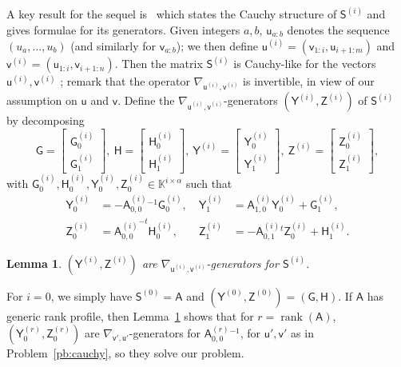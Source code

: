 \documentclass{sig-alternate}
\newcommand{\vu}{\ensuremath{\mathsf{u}}}
\newcommand{\vv}{\ensuremath{\mathsf{v}}}
\newcommand{\mA}{\ensuremath{\mathsf{A}}}
\newcommand{\mG}{\ensuremath{\mathsf{G}}}
\newcommand{\mH}{\ensuremath{\mathsf{H}}}
\newcommand{\mS}{\ensuremath{\mathsf{S}}}
\newcommand{\mY}{\ensuremath{\mathsf{Y}}}
\newcommand{\mZ}{\ensuremath{\mathsf{Z}}}
\newcommand{\K}{\ensuremath{\mathbb{K}}}
\newcommand{\rank}{\ensuremath{\operatorname{rank}}}
\newtheorem{lemma}[definition]{Lemma}
\begin{document}
A key result for the sequel is~\cite[Proposition~1]{Cardinal99} which states the
Cauchy structure of $\mS^{(i)}$ and gives formulae for its generators. Given
integers $a,b$, $\vu_{a:b}$ denotes the sequence $(u_a,\dots,u_b)$ (and
similarly for $\vv_{a:b}$); we then define $\vu^{(i)}=(\vv_{1:i},\vu_{i+1:m})$
and $\vv^{(i)}=(\vu_{1:i},\vv_{i+1:n})$. Then the matrix $\mS^{(i)}$ is
Cauchy-like for the vectors $\vu^{(i)}, \vv^{(i)}$ ; remark that the operator
$\nabla_{\vu^{(i)},\vv^{(i)}}$ is invertible, in view of our assumption on $\vu$
and $\vv$. Define the $\nabla_{\vu^{(i)},\vv^{(i)}}$-generators
$(\mY^{(i)}, \mZ^{(i)})$ of $\mS^{(i)}$ by decomposing
\[
 \mG=\begin{bmatrix} 
   \mG^{(i)}_0 \\ \mG^{(i)}_1
  \end{bmatrix},\ 
  \mH=\begin{bmatrix} 
        \mH^{(i)}_0 \\    \mH^{(i)}_1 
  \end{bmatrix},\ 
 \mY^{(i)}
 = \begin{bmatrix}
  \mY^{(i)}_0 \\    \mY^{(i)}_1 
     \end{bmatrix},\ 
\mZ^{(i)}
 = \begin{bmatrix}
  \mZ^{(i)}_0 \\    \mZ^{(i)}_1 
     \end{bmatrix},
\]
with $\mG^{(i)}_0, \mH^{(i)}_0, \mY^{(i)}_0, \mZ^{(i)}_0 \in \K^{i \times \alpha}$ such that
\begin{align}
\mY^{(i)}_0&= -{\mA^{(i)}_{0,0}}{}^{-1} \mG^{(i)}_0,\  
&\mY^{(i)}_1&= \mA^{(i)}_{1,0} \mY^{(i)}_0 + \mG^{(i)}_1,\label{eq:defYi}\\
\mZ^{(i)}_0&= {\mA^{(i)}_{0,0}}^{-t} \mH^{(i)}_0,\  
&\mZ^{(i)}_1&=-{\mA^{(i)}_{0,1}}{}^t \mZ^{(i)}_0 + \mH^{(i)}_1\label{eq:defZi}.
\end{align}

\begin{lemma}\label{lemma:cpj-cm}
 $(\mY^{(i)},\mZ^{(i)})$ are $\nabla_{\vu^{(i)},\vv^{(i)}}$-generators for $\mS^{(i)}$.
\end{lemma}

For $i=0$, we simply have $\mS^{(0)}=\mA$ and
$(\mY^{(0)},\mZ^{(0)})=(\mG,\mH)$.  If $\mA$ has generic rank profile,
then Lemma~\ref{lemma:cpj-cm} shows that for $r=\rank(\mA)$,
$(\mY^{(r)}_0,\mZ^{(r)}_0)$ are $\nabla_{\vv',\vu'}$-generators for
${\mA^{(r)}_{0,0}}{}^{-1}$, for $\vu',\vv'$ as in
Problem~\ref{pb:cauchy}, so they solve our problem.
\end{document}
